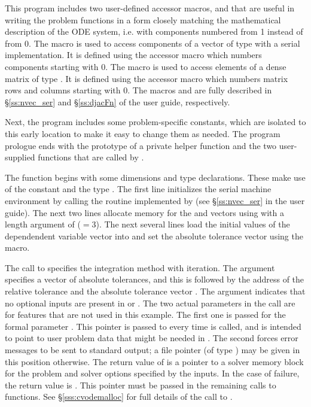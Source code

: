 This program includes two user-defined accessor macros,
 and 
that are useful in writing the problem functions in a form closely
matching the mathematical description of the ODE system, i.e. with
components numbered from 1 instead of from 0. 
The  macro is used to access components of a vector of type 
with a serial implementation. 
It is defined using the {\nvecs} accessor macro  which numbers components 
starting with 0. The  macro is used to access elements of a dense matrix of
type . It is defined using the {\dense} accessor macro 
which numbers matrix rows and columns starting with 0. The macros
 and  are fully described in  \S\ref{ss:nvec_ser} and
\S\ref{ss:djacFn} of the user guide, respectively.

Next, the program includes some problem-specific constants, which are
isolated to this early location to make it easy to change them as
needed.
The program prologue ends with the prototype of a private helper
function and the two user-supplied functions that are called by
{\cvode}.

The  function begins with some dimensions and type
declarations.  These make use of the constant  and the
type .  The first line initializes the serial machine environment
by calling the  routine implemented by {\nvecs}
(see \S\ref{ss:nvec_ser} in the user guide). The next two lines allocate memory for the
 and  vectors using  with a length
argument of  ($= 3$). The next several lines load the initial
values of the dependendent variable vector into  and set the
absolute tolerance vector  using the  macro.

The call to  specifies the  integration
method with  iteration.  The  argument specifies
a vector of absolute tolerances, and this is followed by the
address of the relative tolerance  and the absolute
tolerance vector .
The  argument indicates that no optional inputs are present
in  or .
The two  actual parameters in the  call 
are for features that are not used in this example. 
The first one is passed for the  formal parameter 
.  This pointer is passed to  every time 
is called, and is intended to point to user problem data that might be
needed in .  The second  forces {\cvode} error messages to
be sent to standard output; a file pointer (of type ) may be
given in this position otherwise.  
The return value of  is a pointer to a
{\cvode} solver memory block for the problem and solver options specified
by the inputs.  In the case of failure, the return value is .
This pointer must be passed in the remaining calls to {\cvode} functions. 
See \S\ref{sss:cvodemalloc} for full details of the call to .

